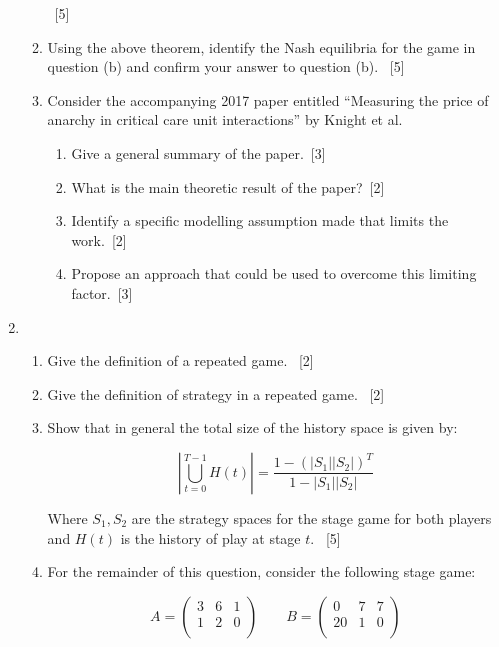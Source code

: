 \documentclass[12pt,a4paper]{article}
\begin{document}
\begin{enumerate}
\begin{enumerate}
              ~\hfill{[5]}

        \item Using the above theorem, identify the Nash equilibria for the game
            in question (b) and confirm your answer to question (b).
              ~\hfill{[5]}

        \item Consider the accompanying 2017 paper entitled ``Measuring the price
            of anarchy in critical care unit interactions'' by Knight et al.

            \begin{enumerate}
                \item Give a general summary of the paper.~\hfill{[3]}
                \item What is the main theoretic result of the
                    paper?~\hfill{[2]}
                \item Identify a specific modelling assumption made that limits
                    the work.~\hfill{[2]}
                \item Propose an approach that could be used to overcome
                    this limiting factor.~\hfill{[3]}
            \end{enumerate}
    \end{enumerate}

\newpage
\item

    \begin{enumerate}
        \item Give the definition of a repeated game.
            ~\hfill{[2]}
        \item Give the definition of strategy in a repeated game.
            ~\hfill{[2]}

        \item Show that in general the total size of the history space is given
            by:

            \[
                \left|\bigcup_{t=0}^{T-1}H(t)\right| = \frac{1 - (|S_1||S_2|)^T}{1 - |S_1||S_2|}
            \]

            Where \(S_1, S_2\) are the strategy spaces for the stage game for
            both players and \(H(t)\) is the history of play at stage \(t\).
            ~\hfill{[5]}
        \item For the remainder of this question, consider the following stage
            game:

            \[
                A = \begin{pmatrix}
                    3 & 6 & 1\\
                    1 & 2 & 0\\
                    \end{pmatrix}
                \qquad
                B = \begin{pmatrix}
                    0 & 7 & 7\\
                   20 & 1 & 0\\
                    \end{pmatrix}
            \]



\end{enumerate}
\end{enumerate}
\end{document}
